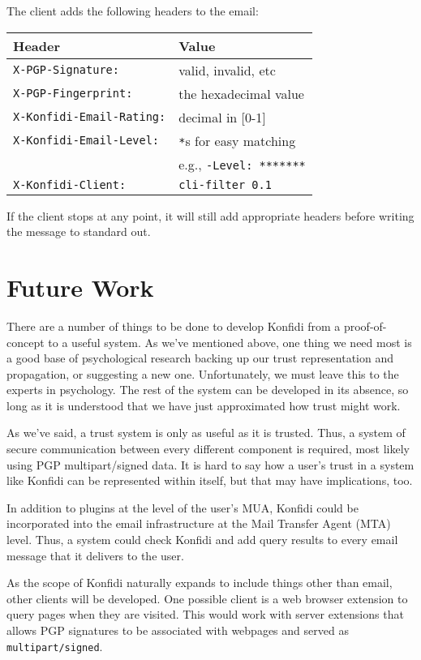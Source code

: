\documentclass[letterpaper]{www2006-submission}
\begin{document}
The client adds the following headers to the email:
\begin{center}
\begin{tabular}{ll}
\textbf{Header} & \textbf{Value} \\
\hline
\texttt{X-PGP-Signature:}        & valid, invalid, etc \\
\texttt{X-PGP-Fingerprint:}      & the hexadecimal value \\
\texttt{X-Konfidi-Email-Rating:} & decimal in [0-1] \\
\texttt{X-Konfidi-Email-Level:}  & \texttt{*}s for easy matching \\
                                 & e.g., \texttt{-Level: *******} \\
\texttt{X-Konfidi-Client:}       & \texttt{cli-filter 0.1} \\
\end{tabular}
\end{center}

If the client stops at any point, it will still add appropriate headers before writing the message to standard out.

\section{Future Work}
There are a number of things to be done to develop Konfidi from a proof-of-concept to a useful system.  As we've mentioned above, one thing we need most is a good base of psychological research backing up our trust representation and propagation, or suggesting a new one.  Unfortunately, we must leave this to the experts in psychology.  The rest of the system can be developed in its absence, so long as it is understood that we have just approximated how trust might work.

As we've said, a trust system is only as useful as it is trusted.  Thus, a system of secure communication between every different component is required, most likely using PGP multipart/signed data.  It is hard to say how a user's trust in a system like Konfidi can be represented within itself, but that may have implications, too.

In addition to plugins at the level of the user's MUA, Konfidi could be incorporated into the email infrastructure at the Mail Transfer Agent (MTA) level.  Thus, a system could check Konfidi and add query results to every email message that it delivers to the user.

As the scope of Konfidi naturally expands to include things other than email, other clients will be developed.  One possible client is a web browser extension to query pages when they are visited.  This would work with server extensions that allows PGP signatures to be associated with webpages and served as \texttt{multipart/signed}.
\end{document}
